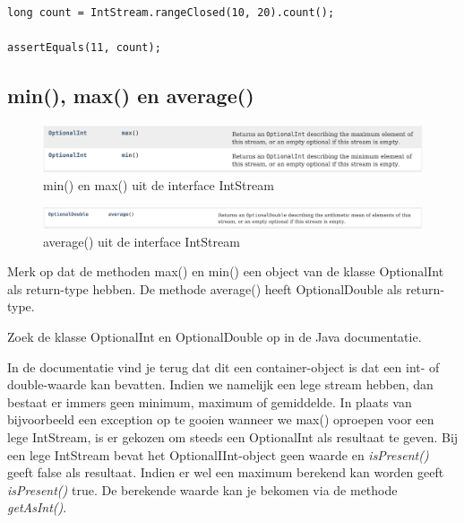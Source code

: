 \begin{lstlisting}
long count = IntStream.rangeClosed(10, 20).count();

assertEquals(11, count);
\end{lstlisting}

\subsection{min(), max() en average()}

\begin{figure}[H]
\includegraphics[width=\linewidth]{images/chapter_streams/intstream_max_min.png}
\caption{min() en max() uit de interface IntStream}
\label{fig:instream_min_max}
\end{figure}

\begin{figure}[H]
\includegraphics[width=\linewidth]{images/chapter_streams/intstream_average.png}
\caption{average() uit de interface IntStream}
\label{fig:instream_average}
\end{figure}

Merk op dat de methoden max() en min() een object van de klasse OptionalInt als return-type hebben. De methode average() heeft OptionalDouble als return-type. 

\begin{oefening}
Zoek de klasse OptionalInt en OptionalDouble op in de Java documentatie.
\end{oefening}

In de documentatie vind je terug dat dit een container-object is dat een int- of double-waarde kan bevatten. Indien we namelijk een lege stream hebben, dan bestaat er immers geen minimum, maximum of gemiddelde. In plaats van bijvoorbeeld een exception op te gooien wanneer we max() oproepen voor een lege IntStream, is er gekozen om steeds een OptionalInt als resultaat te geven. Bij een lege IntStream bevat het OptionalIInt-object geen waarde en \textit{isPresent()} geeft false als resultaat. Indien er wel een maximum berekend kan worden geeft \textit{isPresent()} true. De berekende waarde kan je bekomen via de methode \textit{getAsInt()}.

